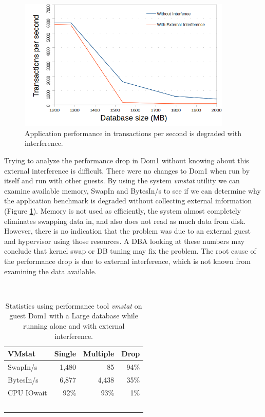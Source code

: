 \begin{figure}[!h]
  \begin{center}
  \includegraphics[width=4in]{images/MedScale.png}
  \caption{Application performance in transactions per second is degraded with interference.}
  \label{fig:medIO}
  \end{center}
\end{figure}

Trying to analyze the performance drop in Dom1 without knowing about this external interference is difficult.  There were no changes to Dom1 when run by itself and run with other guests.  By using the system \emph{vmstat} utility we can examine available memory, SwapIn and BytesIn/s to see if we can determine why the application benchmark is degraded without collecting external information (Figure \ref{fig:vmstat}).  Memory is not used as efficiently, the system almost completely eliminates swapping data in, and also does not read as much data from disk.  However, there is no indication that the problem was due to an external guest and hypervisor using those resources.  A DBA looking at these numbers may conclude that kernel swap or DB tuning may fix the problem.  
The root cause of the performance drop is due to external interference, which is not known from examining the data available.

\begin{table}[h]
  \begin{tabular}{ l | r | r | r }
    VMstat & Single & Multiple & Drop \\ \hline
	SwapIn/s & 1,480 & 85 & 94\% \\
	BytesIn/s & 6,877 & 4,438 & 35\% \\
	CPU IOwait & 92\% & 93\% & 1\% \\
  \end{tabular}
\caption{Statistics using performance tool \emph{vmstat} on guest Dom1 with a Large database while running alone and with external interference.} 
\label{fig:vmstat}
\end{table}

